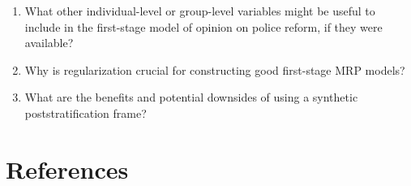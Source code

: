 \documentclass[
]{article}
\begin{document}
\begin{enumerate}
\def\labelenumi{\arabic{enumi}.}
\item
  What other individual-level or group-level variables might be useful
  to include in the first-stage model of opinion on police reform, if
  they were available?
\item
  Why is regularization crucial for constructing good first-stage MRP
  models?
\item
  What are the benefits and potential downsides of using a synthetic
  poststratification frame?
\end{enumerate}

\hypertarget{references}{%
\section*{References}\label{references}}
\end{document}
